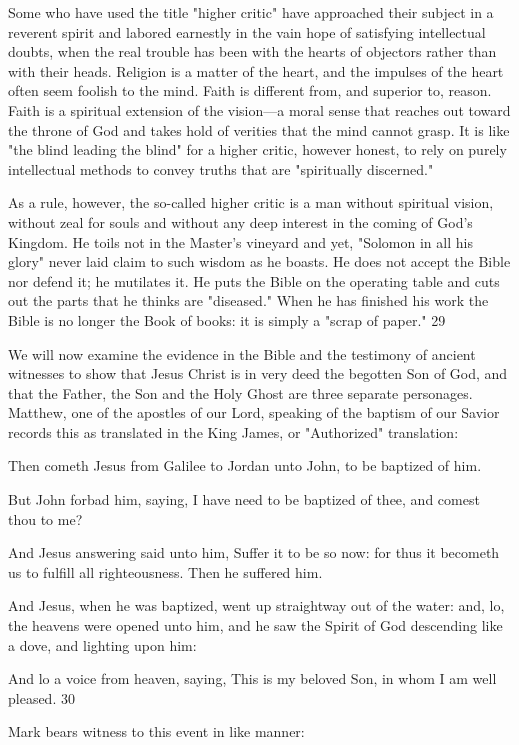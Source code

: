 Some who have used the title "higher critic" have approached their subject in a reverent spirit
and labored earnestly in the vain hope of satisfying intellectual doubts, when the real trouble
has been with the hearts of objectors rather than with their heads. Religion is a matter of the
heart, and the impulses of the heart often seem foolish to the mind. Faith is different from,
and superior to, reason. Faith is a spiritual extension of the vision—a moral sense that
reaches out toward the throne of God and takes hold of verities that the mind cannot grasp. It
is like "the blind leading the blind" for a higher critic, however honest, to rely on purely
intellectual methods to convey truths that are "spiritually discerned."

As a rule, however, the so-called higher critic is a man without spiritual vision, without zeal
for souls and without any deep interest in the coming of God's Kingdom. He toils not in the
Master's vineyard and yet, "Solomon in all his glory" never laid claim to such wisdom as he
boasts. He does not accept the Bible nor defend it; he mutilates it. He puts the Bible on the
operating table and cuts out the parts that he thinks are "diseased." When he has finished his
work the Bible is no longer the Book of books: it is simply a "scrap of paper." 29

We will now examine the evidence in the Bible and the testimony of ancient witnesses to
show that Jesus Christ is in very deed the begotten Son of God, and that the Father, the Son
and the Holy Ghost are three separate personages. Matthew, one of the apostles of our Lord,
speaking of the baptism of our Savior records this as translated in the King James, or
"Authorized" translation:

Then cometh Jesus from Galilee to Jordan unto John, to be baptized of him.

But John forbad him, saying, I have need to be baptized of thee, and comest thou to me?

And Jesus answering said unto him, Suffer it to be so now: for thus it becometh us to fulfill
all righteousness. Then he suffered him.

And Jesus, when he was baptized, went up straightway out of the water: and, lo, the heavens
were opened unto him, and he saw the Spirit of God descending like a dove, and lighting
upon him:

And lo a voice from heaven, saying, This is my beloved Son, in whom I am well pleased. 30

Mark bears witness to this event in like manner:


